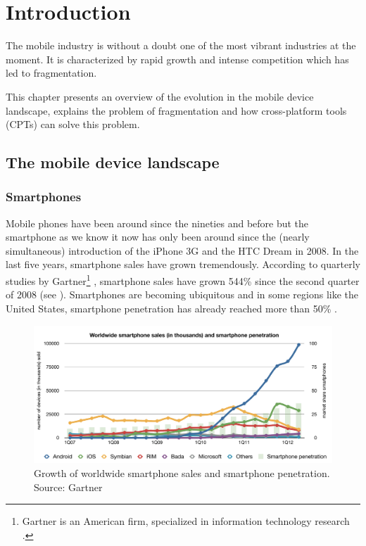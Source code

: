 \chapter{Introduction}
\label{cha:intro}

The mobile industry is without a doubt one of the most vibrant industries at the moment. It is characterized by rapid growth and intense competition which has led to fragmentation. 

This chapter presents an overview of the evolution in the mobile device landscape, explains the problem of fragmentation and how cross-platform tools (CPTs) can solve this problem.

\section{The mobile device landscape}

\subsection{Smartphones}

Mobile phones have been around since the nineties and before but the smartphone as we know it now has only been around since the (nearly simultaneous) introduction of the iPhone 3G and the HTC Dream in 2008. In the last five years, smartphone sales have grown tremendously. According to quarterly studies by Gartner\footnote{Gartner is an American firm, specialized in information technology research \cite{Gartner}.} \citeGartner, smartphone sales have grown 544\% since the second quarter of 2008 (see ). Smartphones are becoming ubiquitous and in some regions like the United States, smartphone penetration has already reached more than 50\% \cite{Nielsen:2012}. 

\begin{figure}[h!]
    \begin{center}
        \includegraphics[width=\textwidth]{figs/smartphone_sales.pdf}
        	\caption{
        	    Growth of worldwide smartphone sales and smartphone penetration.\newline
        	    Source: Gartner \citeGartner
        	}
        	\label{fig:smartphone-sales}
    \end{center}
\end{figure}

